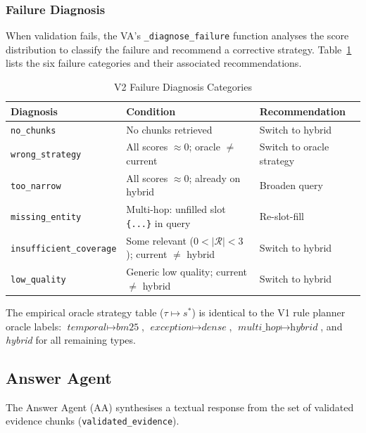 \subsubsection*{Failure Diagnosis}

When validation fails, the VA's \texttt{\_diagnose\_failure} function
analyses the score distribution to classify the failure and recommend a
corrective strategy. Table~\ref{tab:v2_failure} lists the six failure
categories and their associated recommendations.

\begin{table}[H]
\centering
\caption{V2 Failure Diagnosis Categories}
\label{tab:v2_failure}
\begin{tabular}{lll}
\toprule
\textbf{Diagnosis} & \textbf{Condition} & \textbf{Recommendation} \\
\midrule
\texttt{no\_chunks}             & No chunks retrieved & Switch to hybrid \\
\texttt{wrong\_strategy}        & All scores $\approx 0$; oracle $\neq$ current & Switch to oracle strategy \\
\texttt{too\_narrow}            & All scores $\approx 0$; already on hybrid & Broaden query \\
\texttt{missing\_entity}        & Multi-hop: unfilled slot \texttt{\{...\}} in query & Re-slot-fill \\
\texttt{insufficient\_coverage} & Some relevant ($0 < |\mathcal{R}| < 3$); current $\neq$ hybrid & Switch to hybrid \\
\texttt{low\_quality}           & Generic low quality; current $\neq$ hybrid & Switch to hybrid \\
\bottomrule
\end{tabular}
\end{table}

The empirical oracle strategy table ($\tau \mapsto s^*$) is identical to the
V1 rule planner oracle labels: $\textit{temporal} \mapsto \textit{bm25}$,
$\textit{exception} \mapsto \textit{dense}$, $\textit{multi\_hop} \mapsto
\textit{hybrid}$, and \textit{hybrid} for all remaining types.


\subsection{Answer Agent}
\label{subsec:v2_answer}

The Answer Agent (AA) synthesises a textual response from the set of
validated evidence chunks (\texttt{validated\_evidence}).

